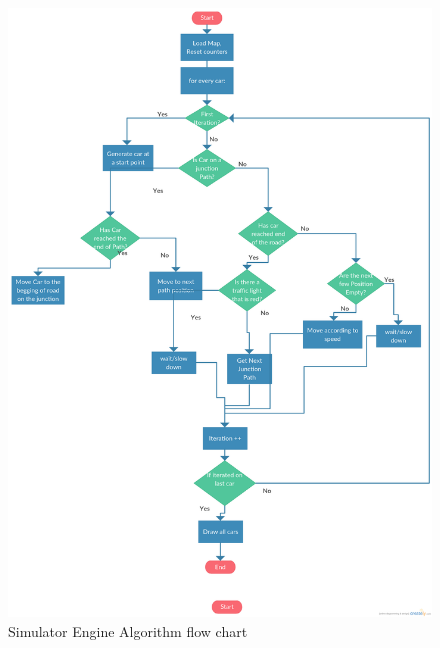 \documentclass[11pt]{article}
\begin{document}
{\begin{itemize}
\begin{figure}
    \centering
    \includegraphics[scale=.2]{flowchart}
    \caption{Simulator Engine Algorithm flow chart}
    \label{flow chart}
\end{figure}



\end{itemize}}
\end{document}

